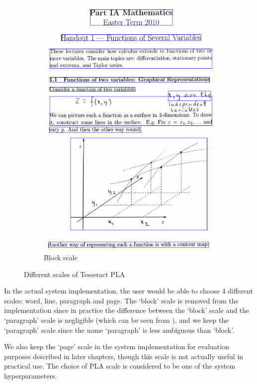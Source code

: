 \begin{figure}[!htb]
\begin{subfigure}{.45\textwidth}
    \includegraphics[width=\textwidth]{pla-block.png}
    \caption{Block scale}
  \end{subfigure}
  \caption{Different scales of Tesseract PLA}
  \label{fig:tess-pla-scales}
\end{figure}

In the actual system implementation, the user would be able to choose 4 different scales: word, line, paragraph and page. The `block' scale is removed from the implementation since in practice the difference between the `block' scale and the `paragraph' scale is negligible (which can be seen from ), and we keep the `paragraph' scale since the name `paragraph' is less ambiguous than `block'. 

We also keep the `page' scale in the system implementation for evaluation purposes described in later chapters, though this scale is not actually useful in practical use. The choice of PLA scale is considered to be one of the system hyperparameters.

